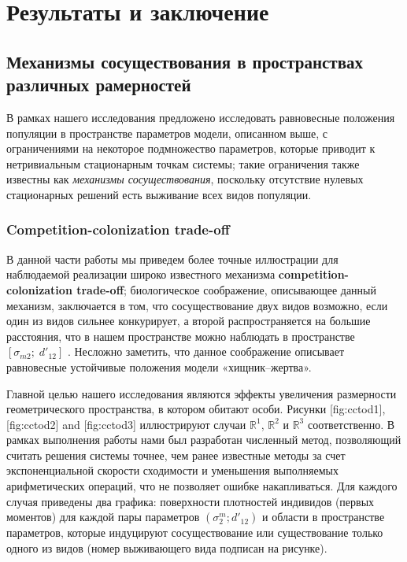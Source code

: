 \chapter{Результаты и заключение}

\section{Механизмы сосуществования в пространствах различных рамерностей}

В рамках нашего исследования предложено исследовать равновесные положения популяции в пространстве параметров модели, описанном выше, с ограничениями на некоторое подмножество параметров, которые приводит к нетривиальным стационарным точкам системы; такие ограничения также известны как \textit{механизмы сосуществования}, поскольку отсутствие нулевых стационарных решений есть выживание всех видов популяции.

\subsection{Competition-colonization trade-off}

В данной части работы мы приведем более точные иллюстрации для наблюдаемой реализации широко известного механизма \textbf{competition-colonization trade-off}; биологическое соображение, описывающее данный механизм, заключается в том, что сосуществование двух видов возможно, если один из видов сильнее конкурирует, а второй распространяется на большие расстояния, что в нашем пространстве можно наблюдать в пространстве $ \left[\sigma_{m2};\;d'_{12}\right] $ . Несложно заметить, что данное соображение описывает равновесные устойчивые положения модели «хищник–жертва».

Главной целью нашего исследования являются эффекты увеличения размерности геометрического пространства, в котором обитают особи. Рисунки [fig:cctod1], [fig:cctod2] and [fig:cctod3] иллюстрируют случаи $ \mathbb{R}^{1} $, $ \mathbb{R}^{2} $ и $ \mathbb{R}^{3} $ соответственно. В рамках выполнения работы нами был разработан численный метод, позволяющий считать решения системы точнее, чем ранее известные методы за счет экспоненциальной скорости сходимости и уменьшения выполняемых арифметических операций, что не позволяет ошибке накапливаться. Для каждого случая приведены два графика: поверхности плотностей индивидов (первых моментов) для каждой пары параметров $ (\sigma_{2}^{m};d'_{12}) $ и области в пространстве параметров, которые индуцируют сосуществование или существование только одного из видов (номер выживающего вида подписан на рисунке).

